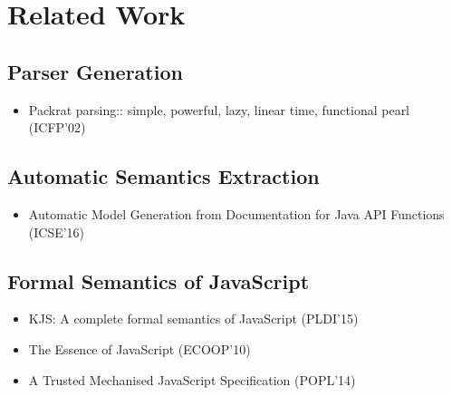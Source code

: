 \section{Related Work}

\subsection{Parser Generation}
\begin{itemize}
  \item Packrat parsing:: simple, powerful, lazy, linear time, functional pearl (ICFP'02)~\cite{packrat}
\end{itemize}

\subsection{Automatic Semantics Extraction}
\begin{itemize}
  \item Automatic Model Generation from Documentation for Java API Functions (ICSE'16)~\cite{javadoc}
\end{itemize}

\subsection{Formal Semantics of JavaScript}
\begin{itemize}
  \item KJS: A complete formal semantics of JavaScript (PLDI'15)~\cite{kjs}
  \item The Essence of JavaScript (ECOOP'10)~\cite{lambdajs}
  \item A Trusted Mechanised JavaScript Specification (POPL'14)~\cite{jscert}
\end{itemize}
